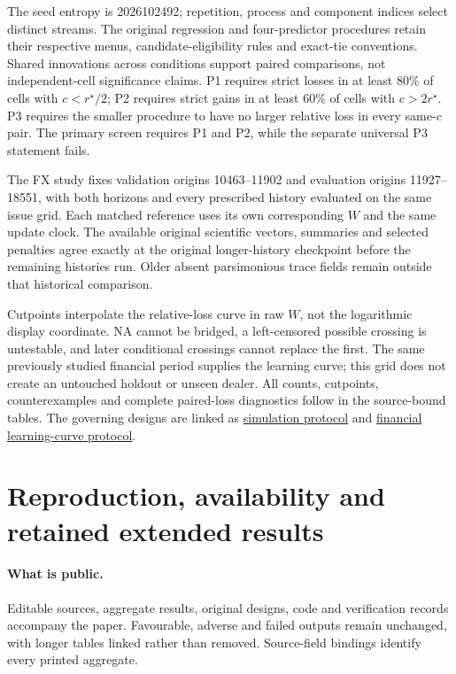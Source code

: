 \documentclass[11pt,a4paper]{article}
\begin{document}
The seed entropy is 2026102492; repetition, process and component indices select distinct streams. The original regression and four-predictor procedures retain their respective menus, candidate-eligibility rules and exact-tie conventions. Shared innovations across conditions support paired comparisons, not independent-cell significance claims. P1 requires strict losses in at least 80\% of cells with $c<r^\star/2$; P2 requires strict gains in at least 60\% of cells with $c>2r^\star$. P3 requires the smaller procedure to have no larger relative loss in every same-$c$ pair. The primary screen requires P1 and P2, while the separate universal P3 statement fails.

The FX study fixes validation origins 10463--11902 and evaluation origins 11927--18551, with both horizons and every prescribed history evaluated on the same issue grid. Each matched reference uses its own corresponding $W$ and the same update clock. The available original scientific vectors, summaries and selected penalties agree exactly at the original longer-history checkpoint before the remaining histories run. Older absent parsimonious trace fields remain outside that historical comparison.

Cutpoints interpolate the relative-loss curve in raw $W$, not the logarithmic display coordinate. NA cannot be bridged, a left-censored possible crossing is untestable, and later conditional crossings cannot replace the first. The same previously studied financial period supplies the learning curve; this grid does not create an untouched holdout or unseen dealer. All counts, cutpoints, counterexamples and complete paired-loss diagnostics follow in the source-bound tables. The governing designs are linked as \href{https://github.com/ByronLi0207/financial-mathematics-paper-20261020/blob/revision-v8-goal/protocol/revision-v9/wp2-confirmatory.md}{simulation protocol} and \href{https://github.com/ByronLi0207/financial-mathematics-paper-20261020/blob/revision-v8-goal/protocol/revision-v9/wp3-learning-curve.md}{financial learning-curve protocol}.



\section{Reproduction, availability and retained extended results}\label{sup:reproduction}

\paragraph{What is public.}
Editable sources, aggregate results, original designs, code and verification
records accompany the paper. Favourable, adverse and failed outputs remain
unchanged, with longer tables linked rather than removed. Source-field
bindings identify every printed aggregate.
\end{document}
